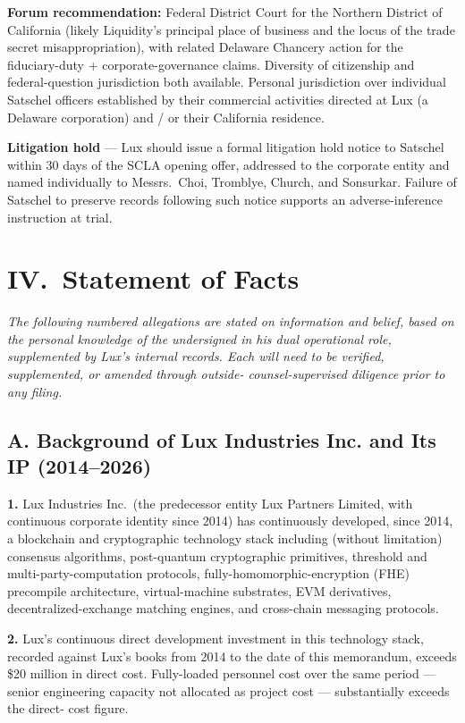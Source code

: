 \documentclass[11pt,letterpaper]{article}
\begin{document}
\textbf{Forum recommendation:} Federal District Court for the Northern
District of California (likely Liquidity's principal place of business
and the locus of the trade secret misappropriation), with related
Delaware Chancery action for the fiduciary-duty + corporate-governance
claims. Diversity of citizenship and federal-question jurisdiction
both available. Personal jurisdiction over individual Satschel officers
established by their commercial activities directed at Lux (a Delaware
corporation) and / or their California residence.

\textbf{Litigation hold} --- Lux should issue a formal litigation
hold notice to Satschel within 30 days of the SCLA opening offer,
addressed to the corporate entity and named individually to Messrs.\
Choi, Tromblye, Church, and Sonsurkar. Failure of Satschel to preserve
records following such notice supports an adverse-inference instruction
at trial.

\section*{IV.\ Statement of Facts}

\textit{The following numbered allegations are stated on information
and belief, based on the personal knowledge of the undersigned in his
dual operational role, supplemented by Lux's internal records. Each
will need to be verified, supplemented, or amended through outside-
counsel-supervised diligence prior to any filing.}

\subsection*{A. Background of Lux Industries Inc. and Its IP (2014--2026)}

\textbf{1.} Lux Industries Inc.\ (the predecessor entity Lux Partners
Limited, with continuous corporate identity since 2014) has continuously
developed, since 2014, a blockchain and cryptographic technology stack
including (without limitation) consensus algorithms, post-quantum
cryptographic primitives, threshold and multi-party-computation
protocols, fully-homomorphic-encryption (FHE) precompile architecture,
virtual-machine substrates, EVM derivatives, decentralized-exchange
matching engines, and cross-chain messaging protocols.

\textbf{2.} Lux's continuous direct development investment in this
technology stack, recorded against Lux's books from 2014 to the date
of this memorandum, exceeds \$20 million in direct cost. Fully-loaded
personnel cost over the same period --- senior engineering capacity
not allocated as project cost --- substantially exceeds the direct-
cost figure.
\end{document}
